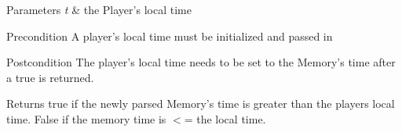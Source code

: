 \begin{DoxyParams}{Parameters}
{\em t} & the Player's local time \\
\hline
\end{DoxyParams}
\begin{DoxyPrecond}{Precondition}
A player's local time must be initialized and passed in 
\end{DoxyPrecond}
\begin{DoxyPostcond}{Postcondition}
The player's local time needs to be set to the Memory's time after a true is returned. 
\end{DoxyPostcond}
\begin{DoxyReturn}{Returns}
true if the newly parsed Memory's time is greater than the players local time. False if the memory time is $<$= the local time. 
\end{DoxyReturn}


